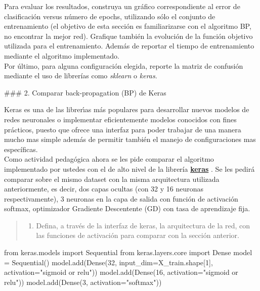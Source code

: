 \documentclass[11pt]{article}
\providecommand{\tightlist}{%
      \setlength{\itemsep}{0pt}\setlength{\parskip}{0pt}}
\newenvironment{Shaded}{}{}
\newcommand{\DecValTok}[1]{\textcolor[rgb]{0.25,0.63,0.44}{{#1}}}
\newcommand{\StringTok}[1]{\textcolor[rgb]{0.25,0.44,0.63}{{#1}}}
\newcommand{\NormalTok}[1]{{#1}}
\newcommand{\ImportTok}[1]{{#1}}
\newcommand{\OperatorTok}[1]{\textcolor[rgb]{0.40,0.40,0.40}{{#1}}}
\begin{document}
Para evaluar los resultados, construya un gráfico correspondiente al
error de clasificación versus número de epochs, utilizando sólo el
conjunto de entrenamiento (el objetivo de esta sección es familiarizarse
con el algoritmo BP, no encontrar la mejor red). Grafique también la
evolución de la función objetivo utilizada para el entrenamiento. Además
de reportar el tiempo de entrenamiento mediante el algoritmo
implementado.\\
Por último, para alguna configuración elegida, reporte la matriz de
confusión mediante el uso de librerías como \emph{sklearn} o
\emph{keras}.

     \#\#\# 2. Comparar back-propagation (BP) de Keras

Keras es una de las librerı́as más populares para desarrollar nuevos
modelos de redes neuronales o implementar eficientemente modelos
conocidos con fines prácticos, puesto que ofrece una interfaz para poder
trabajar de una manera mucho mas simple además de permitir también el
manejo de configuraciones mas específicas.\\
Como actividad pedagógica ahora se les pide comparar el algoritmo
implementado por ustedes con el de alto nivel de la librería
\textbf{\href{https://keras.io/}{keras}} . Se les pedirá comparar sobre
el mismo dataset con la misma arquitectura utilizada anteriormente, es
decir, dos capas ocultas (con 32 y 16 neuronas respectivamente), 3
neuronas en la capa de salida con función de activación softmax,
optimizador Gradiente Descentente (GD) con tasa de aprendizaje fija.

\begin{quote}
\begin{enumerate}
\def\labelenumi{\alph{enumi})}
\tightlist
\item
  Defina, a través de la interfaz de keras, la arquitectura de la red,
  con las funciones de activación para comparar con la sección anterior.
\end{enumerate}
\end{quote}

\begin{Shaded}
\begin{Highlighting}[]
\ImportTok{from}\NormalTok{ keras.models }\ImportTok{import}\NormalTok{ Sequential}
\ImportTok{from}\NormalTok{ keras.layers.core }\ImportTok{import}\NormalTok{ Dense}
\NormalTok{model }\OperatorTok{=}\NormalTok{ Sequential()}
\NormalTok{model.add(Dense(}\DecValTok{32}\NormalTok{, input_dim}\OperatorTok{=}\NormalTok{X_train.shape[}\DecValTok{1}\NormalTok{], activation}\OperatorTok{=}\StringTok{"sigmoid or relu"}\NormalTok{))}
\NormalTok{model.add(Dense(}\DecValTok{16}\NormalTok{, activation}\OperatorTok{=}\StringTok{"sigmoid or relu"}\NormalTok{))}
\NormalTok{model.add(Dense(}\DecValTok{3}\NormalTok{, activation}\OperatorTok{=}\StringTok{"softmax"}\NormalTok{))}
\end{Highlighting}
\end{Shaded}
\end{document}
